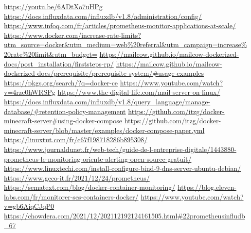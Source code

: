 \documentclass[oneside,12pt]{report}
\begin{document}
\begin{flushleft}
\url{https://youtu.be/6ADtXo7uHPg}\newline
\url{https://docs.influxdata.com/influxdb/v1.8/administration/config/}\newline
\url{https://www.infoq.com/fr/articles/prometheus-monitor-applications-at-scale/}\newline
\url{https://www.docker.com/increase-rate-limits?utm_source=docker&utm_medium=web\%20referral&utm_campaign=increase\%20rate\%20limit&utm_budget=}\newline
\url{https://mailcow.github.io/mailcow-dockerized-docs/post_installation/firststeps-rp/}
\url{https://mailcow.github.io/mailcow-dockerized-docs/prerequisite/prerequisite-system/#usage-examples}\newline
\url{https://pkgs.org/search/?q=docker-ce}\newline
\url{https://www.youtube.com/watch?v=4rzc0hWRSPg}\newline
\url{https://www.the-digital-life.com/mail-server-on-linux/}\newline
\url{https://docs.influxdata.com/influxdb/v1.8/query_language/manage-database/#retention-policy-management}\newline
\url{https://github.com/itzg/docker-minecraft-server#using-docker-compose}\newline
\url{https://github.com/itzg/docker-minecraft-server/blob/master/examples/docker-compose-paper.yml}\newline
\url{https://linuxtut.com/fr/c67f198718286b895308/}\newline
\url{https://www.journaldunet.fr/web-tech/guide-de-l-entreprise-digitale/1443880-prometheus-le-monitoring-oriente-alerting-open-source-gratuit/}\newline
\url{https://www.linuxtechi.com/install-configure-bind-9-dns-server-ubuntu-debian/}\newline
\url{https://www.geco-it.fr/2021/12/24/prometheus/}\newline
\url{https://sematext.com/blog/docker-container-monitoring/}\newline
\url{https://blog.eleven-labs.com/fr/monitorer-ses-containers-docker/}\newline
\url{https://www.youtube.com/watch?v=gb6AiqCJqP0}\newline
\url{https://chowdera.com/2021/12/202112192124161505.html#22prometheusinfludb_67}\newline

\end{flushleft}
\end{document}
